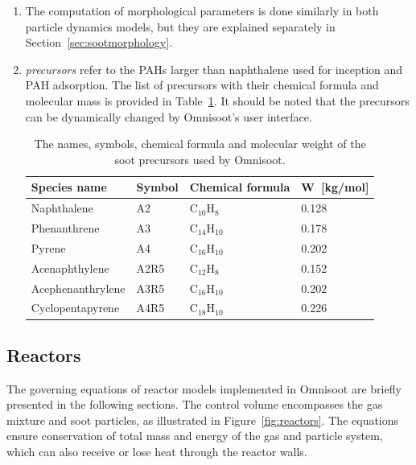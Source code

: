 \begin{enumerate}
\item The computation of morphological parameters is done similarly in both particle dynamics models, but they are explained separately in Section~\ref{sec:sootmorphology}.

\item \textit{precursors} refer to the PAHs larger than naphthalene used for inception and PAH adsorption. The list of precursors with their chemical formula and molecular mass is provided in Table~\ref{tab:precursors_list}. It should be noted that the precursors can be dynamically changed by Omnisoot's user interface.

\renewcommand{\arraystretch}{1.5}
\begin{table}
	\caption{The names, symbols, chemical formula and molecular weight of the soot precursors used by Omnisoot.}
	\label{tab:precursors_list}
	\centering
	\begin{tabular}{l l l l}
		\hline
		Species name & Symbol & Chemical formula & W~[kg/mol] \\
		\hline
		Naphthalene       & A2   &  $\mathrm{C_{10}H_{8}}$   & 0.128 \\
		Phenanthrene      & A3   &  $\mathrm{C_{14}H_{10}}$  & 0.178 \\
		Pyrene            & A4   &  $\mathrm{C_{16}H_{10}}$  & 0.202 \\
		Acenaphthylene    & A2R5 &  $\mathrm{C_{12}H_{8}}$   & 0.152 \\
		Acephenanthrylene & A3R5 &  $\mathrm{C_{16}H_{10}}$  & 0.202 \\
		Cyclopentapyrene  & A4R5 &  $\mathrm{C_{18}H_{10}}$  & 0.226 \\
		\hline
	\end{tabular}
\end{table}

\end{enumerate}

\subsection{Reactors}

The governing equations of reactor models implemented in Omnisoot are briefly presented in the following sections. The control volume encompasses the gas mixture and soot particles, as illustrated in Figure~\ref{fig:reactors}. The equations ensure conservation of total mass and energy of the gas and particle system, which can also receive or lose heat through the reactor walls.


